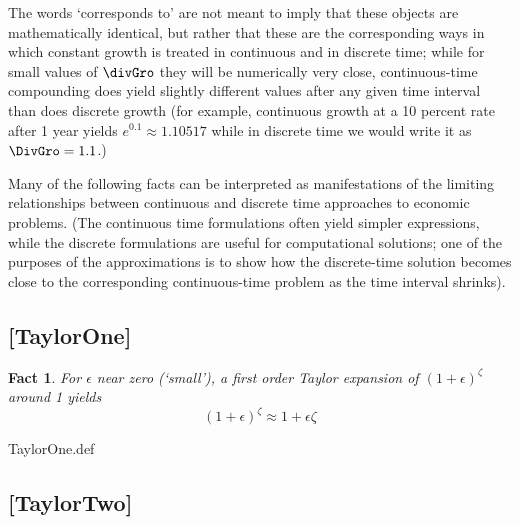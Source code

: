 \documentclass{handout}
\newtheorem{Fact}{Fact}
\providecommand{\currentpdfbookmark}{}
\begin{document}
The words `corresponds to' are not meant to imply that these objects
are mathematically identical, but rather that these are the
corresponding ways in which constant growth is treated in continuous
and in discrete time; while for small values of $\divGro$ they will be
numerically very close, continuous-time compounding does yield
slightly different values after any given time interval than does discrete
growth (for example, continuous growth at a 10 percent rate after 
1 year yields $e^{0.1} \approx 1.10517$ while in discrete time we would write
it as $\DivGro=1.1$.)

Many of the following facts can be interpreted as manifestations of
the limiting relationships between continuous and discrete time
approaches to economic problems.  (The continuous time formulations
often yield simpler expressions, while the discrete formulations are
useful for computational solutions; one of the purposes of the approximations is to show
how the discrete-time solution becomes close to the corresponding
continuous-time problem as the time interval shrinks).

\hypertarget{TaylorOne}{}
\subsection{[TaylorOne]}\label{fact:TaylorOne}


\begin{Fact} For $\epsilon$ near zero (`small'), a first order Taylor expansion
of $(1+\epsilon)^{\zeta}$ around 1 yields
\begin{equation}
 (1+\epsilon)^{\zeta} \approx 1+ \epsilon\zeta 
\end{equation}
\end{Fact}

\begin{verbatimwrite}{TaylorOne.def}
\providecommand{\TaylorOne}{\href{http://www.econ2.jhu.edu/people/ccarroll/public/LectureNotes/MathFacts/MathFactsList\#TaylorOne}{\ensuremath{\mathtt{[TaylorOne]}}}}
\end{verbatimwrite}



\hypertarget{TaylorTwo}{}
\subsection{[TaylorTwo]}\label{fact:TaylorTwo}
\end{document}
